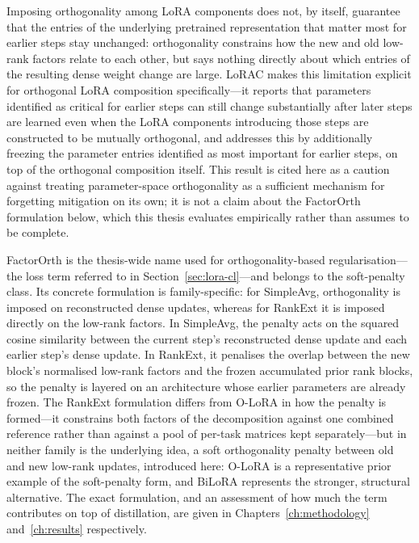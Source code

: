 Imposing orthogonality among LoRA components does not, by itself, guarantee
that the entries of the underlying pretrained representation that matter
most for earlier steps stay unchanged: orthogonality constrains how the new
and old low-rank factors relate to each other, but says nothing directly
about which entries of the resulting dense weight change are large.
LoRAC \parencite{ling2026lorac} makes this limitation explicit for
orthogonal LoRA composition specifically---it reports that parameters
identified as critical for earlier steps can still change substantially
after later steps are learned even when the LoRA components introducing
those steps are constructed to be mutually orthogonal, and addresses this
by additionally freezing the parameter entries identified as most important
for earlier steps, on top of the orthogonal composition itself. This result
is cited here as a caution against treating parameter-space orthogonality
as a sufficient mechanism for forgetting mitigation on its own; it is not a
claim about the FactorOrth formulation below, which this thesis evaluates
empirically rather than assumes to be complete.

FactorOrth is the thesis-wide name used for orthogonality-based
regularisation---the loss term referred to in Section~\ref{sec:lora-cl}---and
belongs to the soft-penalty class. Its concrete formulation is
family-specific: for SimpleAvg, orthogonality is imposed on reconstructed
dense updates, whereas for RankExt it is imposed directly on the low-rank
factors. In SimpleAvg, the penalty acts on the squared cosine similarity
between the current step's reconstructed dense update and each earlier
step's dense update. In RankExt, it penalises the overlap between the new
block's normalised low-rank factors and the frozen accumulated prior rank
blocks, so the penalty is layered on an architecture whose earlier
parameters are already frozen. The RankExt formulation differs from O-LoRA
in how the penalty is formed---it constrains both factors of the
decomposition against one combined reference rather than against a pool of
per-task matrices kept separately---but in neither family is the
underlying idea, a soft orthogonality penalty between old and new low-rank
updates, introduced here: O-LoRA is a representative prior example of the
soft-penalty form, and BiLoRA represents the stronger, structural
alternative.
The exact formulation, and an assessment of how much the term contributes
on top of distillation, are given in Chapters~\ref{ch:methodology} and~\ref{ch:results} respectively.

